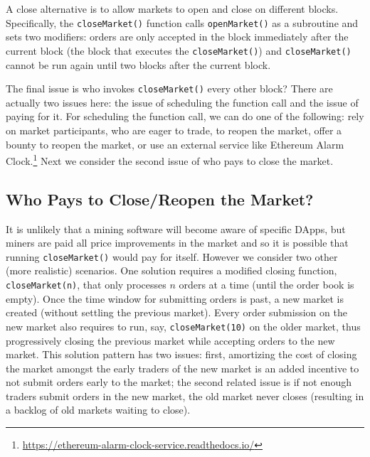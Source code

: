A close alternative is to allow markets to open and close on different blocks. Specifically, the \texttt{closeMarket()} function calls \texttt{openMarket()} as a subroutine and sets two modifiers: orders are only accepted in the block immediately after the current block (\ie the block that executes the \texttt{closeMarket()}) and \texttt{closeMarket()} cannot be run again until two blocks after the current block. 

The final issue is who invokes \texttt{closeMarket()} every other block? There are actually two issues here: the issue of scheduling the function call and the issue of paying for it. For scheduling the function call, we can do one of the following: rely on market participants, who are eager to trade, to reopen the market, offer a bounty to reopen the market, or use an external service like Ethereum Alarm Clock.\footnote{\url{https://ethereum-alarm-clock-service.readthedocs.io/}} Next we consider the second issue of who pays to close the market. 


\subsection{Who Pays to Close/Reopen the Market?}

It is unlikely that a mining software will become aware of specific DApps, but miners are paid all price improvements in the market and so it is possible that running \texttt{closeMarket()} would pay for itself. However we consider two other (more realistic) scenarios. One solution requires a modified closing function, \texttt{closeMarket(n)}, that only processes $n$ orders at a time (until the order book is empty). Once the time window for submitting orders is past, a new market is created (without settling the previous market). Every order submission on the new market also requires to run, say, \texttt{closeMarket(10)} on the older market, thus progressively closing the previous market while accepting orders to the new market. This solution pattern has two issues: first, amortizing the cost of closing the market amongst the early traders of the new market is an added incentive to not submit orders early to the market; the second related issue is if not enough traders submit orders in the new market, the old market never closes (resulting in a backlog of old markets waiting to close).

